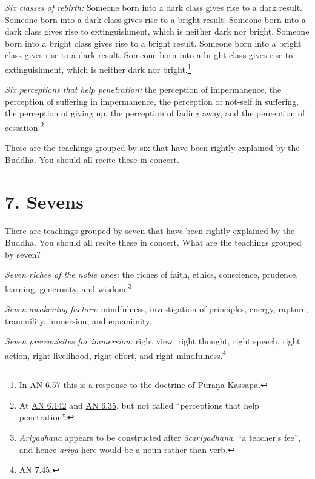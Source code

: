 \documentclass[12pt,openany]{book}%
\begin{document}
\emph{Six classes of rebirth:} Someone born into a dark class gives rise to a dark result. Someone born into a dark class gives rise to a bright result. Someone born into a dark class gives rise to extinguishment, which is neither dark nor bright. Someone born into a bright class gives rise to a bright result. Someone born into a bright class gives rise to a dark result. Someone born into a bright class gives rise to extinguishment, which is neither dark nor bright.\footnote{In \href{https://suttacentral.net/an6.57/en/sujato}{AN 6.57} this is a response to the doctrine of \textsanskrit{Pūraṇa} Kassapa. } 

\emph{Six perceptions that help penetration:} the perception of impermanence, the perception of suffering in impermanence, the perception of not-self in suffering, the perception of giving up, the perception of fading away, and the perception of cessation.\footnote{At \href{https://suttacentral.net/an6.142/en/sujato}{AN 6.142} and \href{https://suttacentral.net/an6.35/en/sujato}{AN 6.35}, but not called “perceptions that help penetration”. } 

These are the teachings grouped by six that have been rightly explained by the Buddha. You should all recite these in concert. 

\section*{7. Sevens }

There are teachings grouped by seven that have been rightly explained by the Buddha. You should all recite these in concert. What are the teachings grouped by seven? 

\emph{Seven riches of the noble ones:} the riches of faith, ethics, conscience, prudence, learning, generosity, and wisdom.\footnote{\textit{Ariyadhana} appears to be constructed after \textit{\textsanskrit{ācariyadhana}}, “a teacher’s fee”, and hence \textit{ariya} here would be a noun rather than verb. } 

\emph{Seven awakening factors:} mindfulness, investigation of principles, energy, rapture, tranquility, immersion, and equanimity. 

\emph{Seven prerequisites for immersion:} right view, right thought, right speech, right action, right livelihood, right effort, and right mindfulness.\footnote{\href{https://suttacentral.net/an7.45/en/sujato}{AN 7.45}. } 
\end{document}

